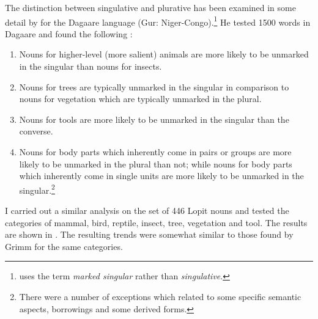 \documentclass[output=paper]{langsci/langscibook}
\begin{document}
The distinction between singulative and plurative has been examined in some detail by \citet{Grimm2012} for the Dagaare language (Gur: Niger-Congo).\footnote{ \citet{Grimm2012} uses the term \textit{marked singular} rather than \textit{singulative}.} He tested 1500 words in Dagaare and found the following \citep[50]{Grimm2012}:

\begin{enumerate}[label=\roman*.]
\item Nouns for higher-level (more salient) animals are more likely to be unmarked in the singular than nouns for insects. 
\item Nouns for trees are typically unmarked in the singular in comparison to nouns for vegetation which are typically unmarked in the plural. 
\item Nouns for tools are more likely to be unmarked in the singular than the converse. 
\item Nouns for body parts which inherently come in pairs or groups are more likely to be unmarked in the plural than not; while nouns for body parts which inherently come in single units are more likely to be unmarked in the singular.\footnote{There were a number of exceptions which related to some specific semantic aspects, borrowings and some derived forms.}
\end{enumerate}

I carried out a similar analysis on the set of 446 Lopit nouns and tested the categories of mammal, bird, reptile, insect, tree, vegetation and tool. The results are shown in . The resulting trends were somewhat similar to those found by Grimm for the same categories. 
\end{document}
